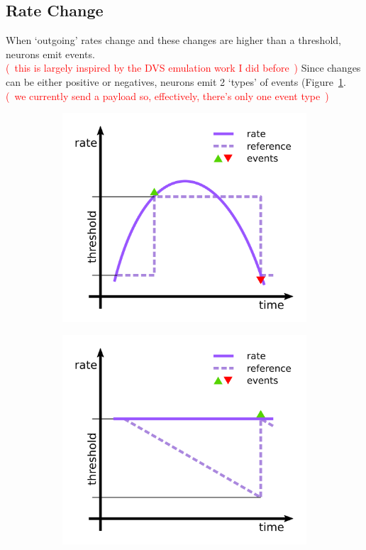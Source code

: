 \documentclass{article}
\newcommand\note[1]{\textcolor{red}{(~#1~)}}
\begin{document}
\subsection{Rate Change}
When `outgoing' rates change and these changes are higher than a threshold, neurons emit events. \\
\note{this is largely inspired by the DVS emulation work I did before}
Since changes can be either positive or negatives, neurons emit 2 `types' of events (Figure~\ref{fig:rate-changes-events}.
\note{we currently send a payload so, effectively, there's only one event type}

\begin{figure}[h!bt]
    \centering
    \begin{subfigure}[b]{0.3\textwidth}
        \centering
        \includegraphics[width=\textwidth]{drate_events.png}
        \caption{}
        \label{fig:rate-changes-events}
    \end{subfigure}
    \hspace*{1.5cm}
    \begin{subfigure}[b]{0.3\textwidth}
        \centering
        \includegraphics[width=\textwidth]{drate_decay_events.png}

\end{subfigure}
\end{figure}
\end{document}
